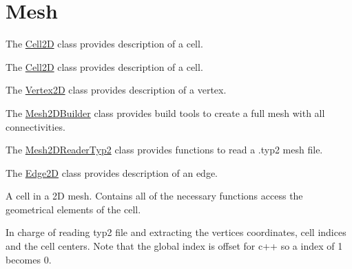 \hypertarget{group__Mesh}{}\section{Mesh}
\label{group__Mesh}


The \hyperlink{classMeshFramework2D_1_1Cell2D}{Cell2D} class provides description of a cell.  


The \hyperlink{classMeshFramework2D_1_1Cell2D}{Cell2D} class provides description of a cell. 

The \hyperlink{classMeshFramework2D_1_1Vertex2D}{Vertex2D} class provides description of a vertex.

The \hyperlink{classMeshFramework2D_1_1Mesh2DBuilder}{Mesh2\+D\+Builder} class provides build tools to create a full mesh with all connectivities.

The \hyperlink{classMeshFramework2D_1_1Mesh2DReaderTyp2}{Mesh2\+D\+Reader\+Typ2} class provides functions to read a .typ2 mesh file.

The \hyperlink{classMeshFramework2D_1_1Edge2D}{Edge2D} class provides description of an edge.

A cell in a 2D mesh. Contains all of the necessary functions access the geometrical elements of the cell.

In charge of reading typ2 file and extracting the vertices coordinates, cell indices and the cell centers. Note that the global index is offset for c++ so a index of 1 becomes 0. 